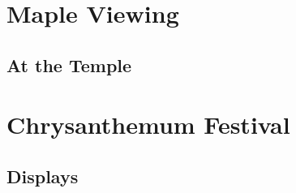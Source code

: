 \documentclass[10pt,twoside,openany]{report}
\begin{document}
\tableofcontents
\chapter{Maple Viewing}
\lipsum[1-5]
\section{At the Temple}
\lipsum[6-9]
\chapter{Chrysanthemum Festival}
\lipsum[10-14]
\section{Displays}
\lipsum[15-18]
\end{document}
